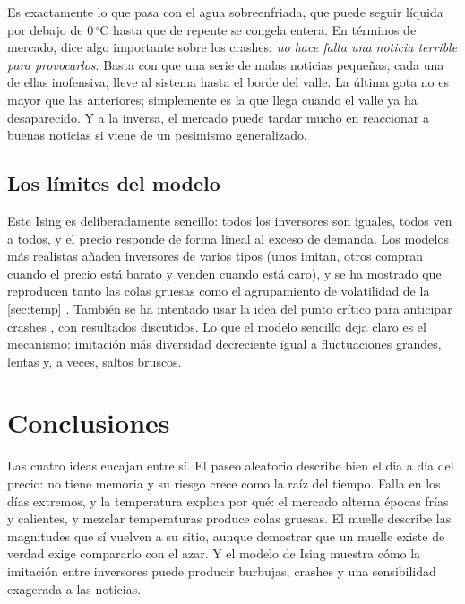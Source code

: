 \documentclass[11pt,a4paper]{article}
\begin{document}
Es exactamente lo que pasa con el agua sobreenfriada, que puede seguir líquida por debajo de $0\,^\circ$C
hasta que de repente se congela entera. En términos de mercado, dice algo importante sobre los crashes:
\emph{no hace falta una noticia terrible para provocarlos}. Basta con que una serie de malas noticias
pequeñas, cada una de ellas inofensiva, lleve al sistema hasta el borde del valle. La última gota no es
mayor que las anteriores; simplemente es la que llega cuando el valle ya ha desaparecido. Y a la inversa,
el mercado puede tardar mucho en reaccionar a buenas noticias si viene de un pesimismo generalizado.

\subsection{Los límites del modelo}

Este Ising es deliberadamente sencillo: todos los inversores son iguales, todos ven a todos, y el precio
responde de forma lineal al exceso de demanda. Los modelos más realistas añaden inversores de varios tipos
(unos imitan, otros compran cuando el precio está barato y venden cuando está caro), y se ha mostrado que
reproducen tanto las colas gruesas como el agrupamiento de volatilidad de la \cref{sec:temp}
\cite{bornholdt2001}. También se ha intentado usar la idea del punto crítico para anticipar crashes
\cite{sornette2003}, con resultados discutidos. Lo que el modelo sencillo deja claro es el mecanismo:
imitación más diversidad decreciente igual a fluctuaciones grandes, lentas y, a veces, saltos bruscos.

\section{Conclusiones}

Las cuatro ideas encajan entre sí. El paseo aleatorio describe bien el día a día del precio: no tiene
memoria y su riesgo crece como la raíz del tiempo. Falla en los días extremos, y la temperatura explica
por qué: el mercado alterna épocas frías y calientes, y mezclar temperaturas produce colas gruesas. El
muelle describe las magnitudes que sí vuelven a su sitio, aunque demostrar que un muelle existe de verdad
exige compararlo con el azar. Y el modelo de Ising muestra cómo la imitación entre inversores puede
producir burbujas, crashes y una sensibilidad exagerada a las noticias.
\end{document}
